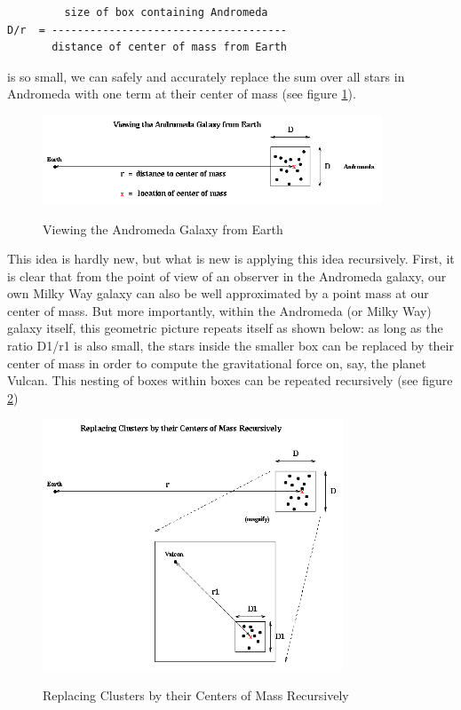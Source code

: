\begin{verbatim}
         size of box containing Andromeda
D/r  = -------------------------------------
       distance of center of mass from Earth
\end{verbatim}

is so small, we can safely and accurately replace the sum over all stars in
Andromeda with one term at their center of mass (see figure \ref{fig:bh-Andromeda}).

\begin{figure}[!htbp]
  \centering
  \includegraphics[width=0.9\textwidth]{graphics/bh/Andromeda.png}
  \label{fig:bh-Andromeda}
  \caption{Viewing the Andromeda Galaxy from Earth}
\end{figure}

This idea is hardly new, but what is new is applying this idea
recursively. First, it is clear that from the point of view of an observer in
the Andromeda galaxy, our own Milky Way galaxy can also be well approximated by
a point mass at our center of mass. But more importantly, within the Andromeda
(or Milky Way) galaxy itself, this geometric picture repeats itself as shown
below: as long as the ratio D1/r1 is also small, the stars inside the smaller
box can be replaced by their center of mass in order to compute the
gravitational force on, say, the planet Vulcan. This nesting of boxes within
boxes can be repeated recursively (see figure \ref{fig:bh-Andromeda1})
\begin{figure}[!htbp]
  \centering
  \includegraphics[width=0.8\textwidth]{graphics/bh/Andromeda1.png}
  \label{fig:bh-Andromeda1}
  \caption{Replacing Clusters by their Centers of Mass Recursively}
\end{figure}

